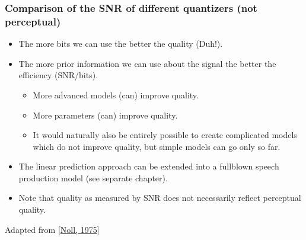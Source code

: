 \documentclass[letterpaper,10pt,english]{jupyterBook}
\begin{document}
\sphinxAtStartPar
{}


\subsubsection{Comparison of the SNR of different quantizers (not perceptual)}
\label{\detokenize{Representations/Waveform:comparison-of-the-snr-of-different-quantizers-not-perceptual}}\begin{itemize}
\item {} 
\sphinxAtStartPar
The more bits we can use the better the quality (Duh!).

\item {} 
\sphinxAtStartPar
The more prior information we can use about the signal the better
the efficiency (SNR/bits).
\begin{itemize}
\item {} 
\sphinxAtStartPar
More advanced models (can) improve quality.

\item {} 
\sphinxAtStartPar
More parameters (can) improve quality.

\item {} 
\sphinxAtStartPar
It would naturally also be entirely possible to create
complicated models which do not improve quality, but simple
models can go only so far.

\end{itemize}

\item {} 
\sphinxAtStartPar
The linear prediction \sphinxhyphen{}approach can be extended into a full\sphinxhyphen{}blown
speech production model (see separate chapter).

\item {} 
\sphinxAtStartPar
Note that quality as measured by SNR does not necessarily reflect
perceptual quality.

\end{itemize}

\sphinxAtStartPar
{}
Adapted from {[}\hyperlink{cite.Representations/Waveform:id44}{Noll, 1975}{]}
\end{document}
